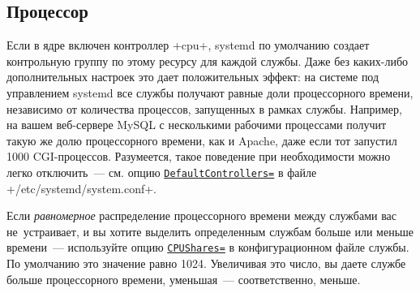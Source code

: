\documentclass[10pt,oneside,a4paper]{article}
\newcommand{\hreftt}[2]{\href{#1}{\texttt{#2}}}
\begin{document}
\subsection{Процессор}

Если в ядре включен контроллер +cpu+, systemd по умолчанию создает контрольную
группу по этому ресурсу для каждой службы. Даже без каких-либо дополнительных
настроек это дает положительных эффект: на системе под управлением systemd все
службы получают равные доли процессорного времени, независимо от количества
процессов, запущенных в рамках службы. Например, на вашем веб-сервере MySQL с
несколькими рабочими процессами получит такую же долю процессорного времени,
как и Apache, даже если тот запустил 1000 CGI-процессов. Разумеется, такое
поведение при необходимости можно легко отключить~--- см. опцию
\hreftt{http://0pointer.de/public/systemd-man/systemd.conf.html}{DefaultControllers=}
в файле +/etc/systemd/system.conf+.

Если \emph{равномерное} распределение процессорного времени между службами вас
не~устраивает, и вы хотите выделить определенным службам больше или меньше
времени~--- используйте опцию
\hreftt{http://0pointer.de/public/systemd-man/systemd.exec.html}{CPUShares=} в
конфигурационном файле службы. По умолчанию это значение равно 1024. Увеличивая
это число, вы даете службе больше процессорного времени, уменьшая~---
соответственно, меньше.
\end{document}
